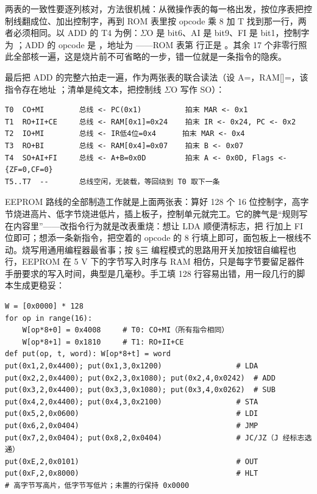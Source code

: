 两表的一致性要逐列核对，方法很机械：从微操作表的每一格出发，按位序表把控制线翻成位、加出控制字，再到 ROM 表里按 opcode 乘 8 加 T 找到那一行，两者必须相同。以 ADD 的 T4 为例：$\Sigma$O 是 bit6、AI 是 bit9、FI 是 bit1，控制字为 ；ADD 的 opcode 是 ，地址为 ——ROM 表第  行正是 。其余 17 个非零行照此全部核一遍，这是烧片前不可省略的一步，错一位就是一条指令的隐疾。

最后把 ADD 的完整六拍走一遍，作为两张表的联合读法（设 A=，RAM[]=，该指令存在地址 ；清单是纯文本，把控制线 $\Sigma$O 写作 SO）：

\begin{lstlisting}
T0  CO+MI        总线 <- PC(0x1)          拍末 MAR <- 0x1
T1  RO+II+CE     总线 <- RAM[0x1]=0x24    拍末 IR <- 0x24, PC <- 0x2
T2  IO+MI        总线 <- IR低4位=0x4      拍末 MAR <- 0x4
T3  RO+BI        总线 <- RAM[0x4]=0x07    拍末 B <- 0x07
T4  SO+AI+FI     总线 <- A+B=0x0D         拍末 A <- 0x0D, Flags <- {ZF=0,CF=0}
T5..T7  --       总线空闲，无装载，等回绕到 T0 取下一条
\end{lstlisting}

EEPROM 路线的全部制造工作就是上面两张表：算好 128 个 16 位控制字，高字节烧进高片、低字节烧进低片，插上板子，控制单元就完工。它的脾气是“规则写在内容里”——改指令行为就是改表重烧：想让 LDA 顺便清标志，把  行加上 FI 位即可；想添一条新指令，把空着的 opcode  的 8 行填上即可，面包板上一根线不动。烧写用通用编程器最省事；按 §三 编程模式的思路用开关加按钮自编程也行，EEPROM 在 5 V 下的字节写入时序与 RAM 相仿，只是每字节要留足器件手册要求的写入时间，典型是几毫秒。手工填 128 行容易出错，用一段几行的脚本生成更稳妥：

\begin{lstlisting}
W = [0x0000] * 128
for op in range(16):
    W[op*8+0] = 0x4008     # T0: CO+MI（所有指令相同）
    W[op*8+1] = 0x1810     # T1: RO+II+CE
def put(op, t, word): W[op*8+t] = word
put(0x1,2,0x4400); put(0x1,3,0x1200)                 # LDA
put(0x2,2,0x4400); put(0x2,3,0x1080); put(0x2,4,0x0242)  # ADD
put(0x3,2,0x4400); put(0x3,3,0x1080); put(0x3,4,0x0262)  # SUB
put(0x4,2,0x4400); put(0x4,3,0x2100)                 # STA
put(0x5,2,0x0600)                                    # LDI
put(0x6,2,0x0404)                                    # JMP
put(0x7,2,0x0404); put(0x8,2,0x0404)                 # JC/JZ（J 经标志选通）
put(0xE,2,0x0101)                                    # OUT
put(0xF,2,0x8000)                                    # HLT
# 高字节写高片，低字节写低片；未置的行保持 0x0000
\end{lstlisting}


